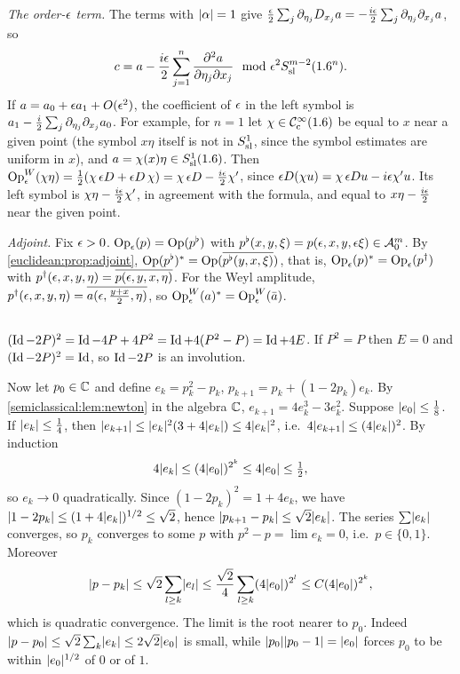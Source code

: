 \emph{The order-$\epsilon$ term.} The terms with $\lvert \alpha\rvert=1$ give
$\frac{\epsilon}2\sum_j\partial_{\eta_j}D_{x_j}a=-\frac{i\epsilon}2\sum_j\partial_{\eta_j}\partial_{x_j}a$, so
\begin{equation*}
c=a-\frac{i\epsilon}2\sum_{j=1}^n\frac{\partial^2a}{\partial\eta_j\partial x_j}\mod{\epsilon}^2S^{m-2}_{\mathrm{sl}}(1.6^n).
\end{equation*}
If $a=a_0+\epsilon a_1+O(\epsilon^2)$, the coefficient of $\epsilon$ in the left symbol is
$a_1-\frac i2\sum_j\partial_{\eta_j}\partial_{x_j}a_0$. For example, for $n=1$ let $\chi\in\mathcal{C}^\infty_{\mathrm{c}}(1.6)$ be equal
to $x$ near a given point (the symbol $x\eta$ itself is not in $S^{1}_{\mathrm{sl}}$, since the symbol
estimates are uniform in $x$), and $a=\chi(x)\eta\in S^{1}_{\mathrm{sl}}(1.6)$. Then
$\operatorname{Op}^W_\epsilon(\chi\eta)=\frac12(\chi\,\epsilon D+\epsilon D\,\chi)=\chi\,\epsilon D-\frac{i\epsilon}2\chi'$, since
$\epsilon D(\chi u)=\chi\,\epsilon Du-i\epsilon\chi'u$. Its left symbol is $\chi\eta-\frac{i\epsilon}2\chi'$, in
agreement with the formula, and equal to $x\eta-\frac{i\epsilon}2$ near the given point.

\emph{Adjoint.} Fix $\epsilon>0$. $\operatorname{Op}_\epsilon(p)=\operatorname{Op}(p^\flat)$ with $p^\flat(x,y,\xi)=p(\epsilon,x,y,\epsilon\xi)\in\mathcal{A}^{m}_{0}$. By
\cref{euclidean:prop:adjoint}, $\operatorname{Op}(p^\flat)^*=\operatorname{Op}(\overline{p^\flat(y,x,\xi)})$, that is,
$\operatorname{Op}_\epsilon(p)^*=\operatorname{Op}_\epsilon(p^\dagger)$ with $p^\dagger(\epsilon,x,y,\eta)=\overline{p(\epsilon,y,x,\eta)}$. For the Weyl
amplitude, $p^\dagger(\epsilon,x,y,\eta)=\overline{a(\epsilon,\frac{y+x}2,\eta)}$, so
$\operatorname{Op}^W_\epsilon(a)^*=\operatorname{Op}^W_\epsilon(\bar a)$.

\subsection*{}
$(\operatorname{Id}-2P)^2=\operatorname{Id}-4P+4P^2=\operatorname{Id}+4(P^2-P)=\operatorname{Id}+4E$. If $P^2=P$ then $E=0$ and $(\operatorname{Id}-2P)^2=\operatorname{Id}$, so
$\operatorname{Id}-2P$ is an involution.

Now let $p_0\in\mathbb{C}$ and define $e_k=p_k^2-p_k$, $p_{k+1}=p_k+(1-2p_k)e_k$. By
\cref{semiclassical:lem:newton} in the algebra $\mathbb{C}$, $e_{k+1}=4e_k^3-3e_k^2$. Suppose
$\lvert e_0\rvert\le\frac18$. If $\lvert e_k\rvert\le\frac14$, then $\lvert e_{k+1}\rvert\le\lvert e_k\rvert^2(3+4\lvert e_k\rvert)\le4\lvert e_k\rvert^2$, i.e.\
$4\lvert e_{k+1}\rvert\le(4\lvert e_k\rvert)^2$. By induction
\begin{equation*}
4\lvert e_k\rvert\le(4\lvert e_0\rvert)^{2^k}\le4\lvert e_0\rvert\le\tfrac12 ,
\end{equation*}
so $e_k\to0$ quadratically. Since $(1-2p_k)^2=1+4e_k$, we have $\lvert 1-2p_k\rvert\le(1+4\lvert e_k\rvert)^{1/2}\le\sqrt2$,
hence $\lvert p_{k+1}-p_k\rvert\le\sqrt2\lvert e_k\rvert$. The series $\sum\lvert e_k\rvert$ converges, so $p_k$ converges to some
$p$ with $p^2-p=\lim e_k=0$, i.e.\ $p\in\{0,1\}$. Moreover
\begin{equation*}
\lvert p-p_k\rvert\le\sqrt2\sum_{l\ge k}\lvert e_l\rvert\le\frac{\sqrt2}4\sum_{l\ge k}(4\lvert e_0\rvert)^{2^l}\le C(4\lvert e_0\rvert)^{2^k},
\end{equation*}
which is quadratic convergence. The limit is the root nearer to $p_0$. Indeed
$\lvert p-p_0\rvert\le\sqrt2\sum_k\lvert e_k\rvert\le2\sqrt2\lvert e_0\rvert$ is small, while
$\lvert p_0\rvert\lvert p_0-1\rvert=\lvert e_0\rvert$ forces $p_0$ to be within $\lvert e_0\rvert^{1/2}$ of $0$ or of $1$.

